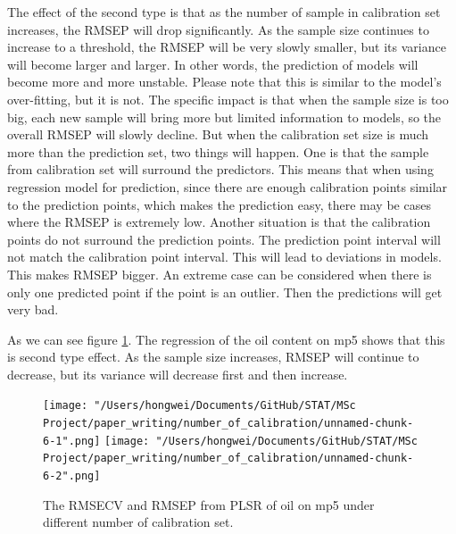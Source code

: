 \documentclass[a4paper,12pt,titlepage]{article} %
\numberwithin{equation}{section}  %
\begin{document}
	The effect of the second type is that as the number of sample in calibration set increases, the RMSEP will drop significantly. As the sample size continues to increase to a threshold, the RMSEP will be very slowly smaller, but its variance will become larger and larger. In other words, the prediction of models will become more and more unstable. Please note that this is similar to the model's over-fitting, but it is not. The specific impact is that when the sample size is too big, each new sample will bring more but limited information to models, so the overall RMSEP will slowly decline. But when the calibration set size is much more than the prediction set, two things will happen. One is that the sample from calibration set will surround the predictors. This means that when using regression model for prediction, since there are enough calibration points similar to the prediction points, which makes the prediction easy, there may be cases where the RMSEP is extremely low. Another situation is that the calibration points do not surround the prediction points. The prediction point interval will not match the calibration point interval. This will lead to deviations in models. This makes RMSEP bigger. An extreme case can be considered when there is only one predicted point if the point is an outlier. Then the predictions will get very bad.
	
	As we can see figure \ref{fig:sample_2}. The regression of the oil content on mp5 shows that this is second type effect. As the sample size increases, RMSEP will continue to decrease, but its variance will decrease first and then increase.
	
				\begin{figure}[h]    %
		\centering           %
		\texttt{[image: "/Users/hongwei/Documents/GitHub/STAT/MSc Project/paper\_writing/number\_of\_calibration/unnamed-chunk-6-1".png]}  %
		\texttt{[image: "/Users/hongwei/Documents/GitHub/STAT/MSc Project/paper\_writing/number\_of\_calibration/unnamed-chunk-6-2".png]}  %
		\caption{The RMSECV and RMSEP from PLSR of oil on mp5 under different number of calibration set.}          %
		\label{fig:sample_2}               %
	\end{figure}                        %
	
\end{document}
